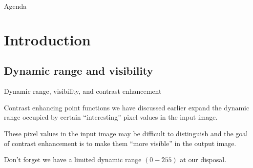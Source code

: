 
%
%
\begin{slide}{Agenda}
\tableofcontents
\end{slide}

%
%
\section{Introduction}

\subsection{Dynamic range and visibility}
%
%
\begin{slide}{Dynamic range, visibility, and contrast enhancement}
\vspace{-3ex}
\vspace{-5ex}
\begin{titlelist}{}{}
\small
\item<2-> 
Contrast enhancing point functions we have discussed
earlier expand the dynamic range occupied by certain 
``interesting'' pixel
values in the input image.

\item<3-> 
These pixel values in the input image may be
difficult to distinguish and the goal of contrast enhancement
is to make them ``more visible'' in the output image.

\item<4-> 
Don't forget we have a limited dynamic range $(0-255)$ at
our disposal.

\end{titlelist}
\end{slide}



